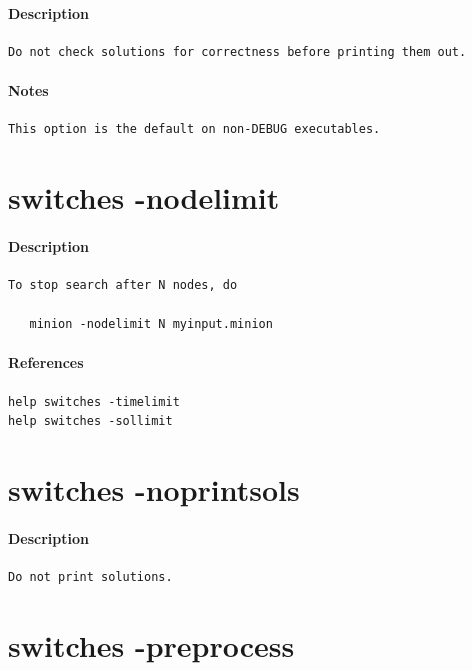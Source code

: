 \documentclass[oneside]{book}
\begin{document}
\paragraph{Description}
{\footnotesize
\begin{verbatim}
Do not check solutions for correctness before printing them out.
\end{verbatim}
}
\paragraph{Notes}
{\footnotesize
\begin{verbatim}
This option is the default on non-DEBUG executables.
\end{verbatim}
}
\section{switches -nodelimit}
\paragraph{Description}
{\footnotesize
\begin{verbatim}
To stop search after N nodes, do

   minion -nodelimit N myinput.minion
\end{verbatim}
}
\paragraph{References}
{\footnotesize
\begin{verbatim}
help switches -timelimit
help switches -sollimit
\end{verbatim}
}
\section{switches -noprintsols}
\paragraph{Description}
{\footnotesize
\begin{verbatim}
Do not print solutions.
\end{verbatim}
}
\section{switches -preprocess}
\end{document}
